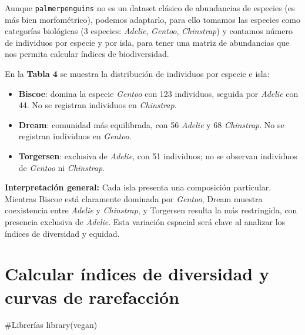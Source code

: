 \documentclass[
  spanish,
  11pt,
  a4paper,
  DIV=11,
  numbers=noendperiod]{scrartcl}
\newenvironment{Shaded}{\begin{snugshade}}{\end{snugshade}}
\newcommand{\CommentTok}[1]{\textcolor[rgb]{0.37,0.37,0.37}{#1}}
\newcommand{\FunctionTok}[1]{\textcolor[rgb]{0.28,0.35,0.67}{#1}}
\newcommand{\NormalTok}[1]{\textcolor[rgb]{0.00,0.23,0.31}{#1}}
\begin{document}
Aunque \texttt{palmerpenguins} no es un dataset clásico de abundancias
de especies (es más bien morfométrico), podemos adaptarlo, para ello
tomamos las especies como categorías biológicas (3 especies:
\emph{Adelie}, \emph{Gentoo}, \emph{Chinstrap}) y contamos número de
individuos por especie y por isla, para tener una matriz de abundancias
que nos permita calcular índices de biodiversidad.

En la \textbf{Tabla 4} se muestra la distribución de individuos por
especie e isla:

\begin{itemize}
\item
  \textbf{Biscoe}: domina la especie \emph{Gentoo} con 123 individuos,
  seguida por \emph{Adelie} con 44. No se registran individuos en
  \emph{Chinstrap}.
\item
  \textbf{Dream}: comunidad más equilibrada, con 56 \emph{Adelie} y 68
  \emph{Chinstrap}. No se registran individuos en \emph{Gentoo}.
\item
  \textbf{Torgersen}: exclusiva de \emph{Adelie}, con 51 individuos; no
  se observan individuos de \emph{Gentoo} ni \emph{Chinstrap}.
\end{itemize}

\textbf{Interpretación general:} Cada isla presenta una composición
particular. Mientras Biscoe está claramente dominada por \emph{Gentoo},
Dream muestra coexistencia entre \emph{Adelie} y \emph{Chinstrap}, y
Torgersen resulta la más restringida, con presencia exclusiva de
\emph{Adelie}. Esta variación espacial será clave al analizar los
índices de diversidad y equidad.

\section{Calcular índices de diversidad y curvas de
rarefacción}\label{calcular-uxedndices-de-diversidad-y-curvas-de-rarefacciuxf3n}

\begin{Shaded}
\begin{Highlighting}[numbers=left,,]
\CommentTok{\#Librerías}
\FunctionTok{library}\NormalTok{(vegan)}
\end{Highlighting}
\end{Shaded}
\end{document}

